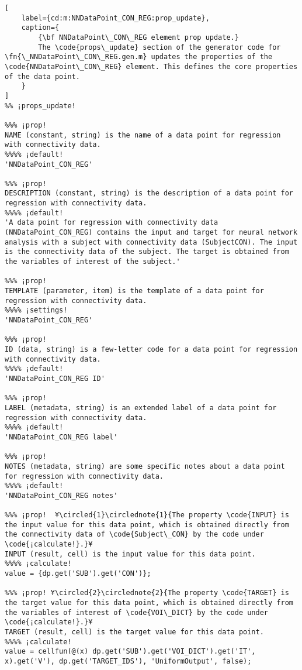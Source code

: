 \documentclass{tufte-handout}
\begin{document}
\begin{lstlisting}[
	label={cd:m:NNDataPoint_CON_REG:prop_update},
	caption={
		{\bf NNDataPoint\_CON\_REG element prop update.}
		The \code{props\_update} section of the generator code for \fn{\_NNDataPoint\_CON\_REG.gen.m} updates the properties of the \code{NNDataPoint\_CON\_REG} element. This defines the core properties of the data point.
	}
]
%% ¡props_update!

%%% ¡prop!
NAME (constant, string) is the name of a data point for regression with connectivity data.
%%%% ¡default!
'NNDataPoint_CON_REG'

%%% ¡prop!
DESCRIPTION (constant, string) is the description of a data point for regression with connectivity data.
%%%% ¡default!
'A data point for regression with connectivity data (NNDataPoint_CON_REG) contains the input and target for neural network analysis with a subject with connectivity data (SubjectCON). The input is the connectivity data of the subject. The target is obtained from the variables of interest of the subject.'

%%% ¡prop!
TEMPLATE (parameter, item) is the template of a data point for regression with connectivity data.
%%%% ¡settings!
'NNDataPoint_CON_REG'

%%% ¡prop!
ID (data, string) is a few-letter code for a data point for regression with connectivity data.
%%%% ¡default!
'NNDataPoint_CON_REG ID'

%%% ¡prop!
LABEL (metadata, string) is an extended label of a data point for regression with connectivity data.
%%%% ¡default!
'NNDataPoint_CON_REG label'

%%% ¡prop!
NOTES (metadata, string) are some specific notes about a data point for regression with connectivity data.
%%%% ¡default!
'NNDataPoint_CON_REG notes'

%%% ¡prop!  ¥\circled{1}\circlednote{1}{The property \code{INPUT} is the input value for this data point, which is obtained directly from the connectivity data of \code{Subject\_CON} by the code under \code{¡calculate!}.}¥
INPUT (result, cell) is the input value for this data point.
%%%% ¡calculate!
value = {dp.get('SUB').get('CON')};
    
%%% ¡prop! ¥\circled{2}\circlednote{2}{The property \code{TARGET} is the target value for this data point, which is obtained directly from the variables of interest of \code{VOI\_DICT} by the code under \code{¡calculate!}.}¥
TARGET (result, cell) is the target value for this data point.
%%%% ¡calculate!
value = cellfun(@(x) dp.get('SUB').get('VOI_DICT').get('IT', x).get('V'), dp.get('TARGET_IDS'), 'UniformOutput', false);

\end{lstlisting}
\end{document}
